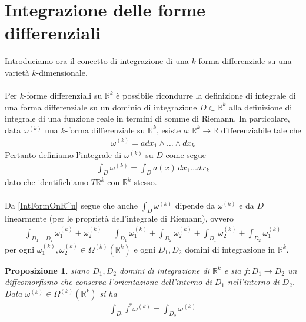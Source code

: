 \documentclass[twoside, 11pt]{amsbook}
\newcommand{\0}{{(0)}}
\newcommand{\3}{{(3)}}
\theoremstyle{colonplain}
\newtheorem{prop}[thm]{Proposizione}
\theoremstyle{colondefinition}
\theoremstyle{colonremark}
\numberwithin{equation}{chapter}
\begin{document}
\section{Integrazione delle forme differenziali}
Introduciamo ora il concetto di integrazione di una $k$-forma differenziale su una varietà $k$-dimensionale. \\ \\
Per $k$-forme differenziali su $\mathbb{R}^k$ è possibile ricondurre la definizione di integrale di una forma differenziale su un dominio di integrazione $D \subset \mathbb{R}^k$ alla definizione di integrale di una funzione reale in termini di somme di Riemann. In particolare, data $\omega^{(k)}$ una $k$-forma differenziale su $\mathbb{R}^k$, esiste $a : \mathbb{R}^k \longrightarrow \mathbb{R}$ differenziabile tale che 
\begin{align}
    \omega^{(k)} = adx_1 \wedge \dots \wedge dx_k 
\end{align}
Pertanto definiamo l'integrale di $\omega^{(k)}$ su $D$ come segue
\begin{align}\label{IntFormOnR^n}
    \int_D \omega^{(k)} = \int_D a(x) \, dx_1 \dots dx_k 
\end{align}
dato che identifichiamo $T\mathbb{R}^k$ con $\mathbb{R}^k$ stesso. \\ \\
Da \eqref{IntFormOnR^n} segue che anche $\int_D \omega^{(k)}$ dipende da $\omega^{(k)}$ e da $D$ linearmente (per le proprietà dell'integrale di Riemann), ovvero
\begin{align}
    \int_{D_1 + D_2} \omega^{(k)}_1 + \omega^{(k)}_2 = \int_{D_1}\omega^{(k)}_1 + \int_{D_2}\omega^{(k)}_2 + \int_{D_1}\omega^{(k)}_2 + \int_{D_2}\omega^{(k)}_1 
\end{align}
per ogni $\omega^{(k)}_1, \omega^{(k)}_2 \in \Omega^{(k)}(\mathbb{R}^k)$ e ogni $D_1, D_2$ domini di integrazione in $\mathbb{R}^k$.
\begin{prop} siano $D_1, D_2$ domini di integrazione di $\mathbb{R}^k$ e sia $f : D_1 \longrightarrow D_2$ un diffeomorfismo che conserva l'orientazione dell'interno di $D_1$ nell'interno di $D_2$. Data $\omega^{(k)} \in \Omega^{(k)}(\mathbb{R}^k)$ si ha
\begin{align}
    \int_{D_1} f^*\omega^{(k)} = \int_{D_2} \omega^{(k) }
\end{align}
\end{prop}
\end{document}
